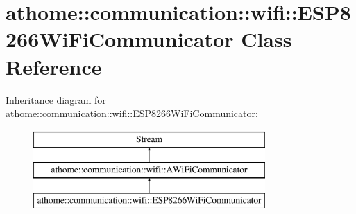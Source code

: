 \hypertarget{classathome_1_1communication_1_1wifi_1_1_e_s_p8266_wi_fi_communicator}{}\section{athome\+:\+:communication\+:\+:wifi\+:\+:E\+S\+P8266\+Wi\+Fi\+Communicator Class Reference}
\label{classathome_1_1communication_1_1wifi_1_1_e_s_p8266_wi_fi_communicator}
Inheritance diagram for athome\+:\+:communication\+:\+:wifi\+:\+:E\+S\+P8266\+Wi\+Fi\+Communicator\+:\begin{figure}[H]
\begin{center}
\leavevmode
\includegraphics[height=3.000000cm]{classathome_1_1communication_1_1wifi_1_1_e_s_p8266_wi_fi_communicator}
\end{center}
\end{figure}
